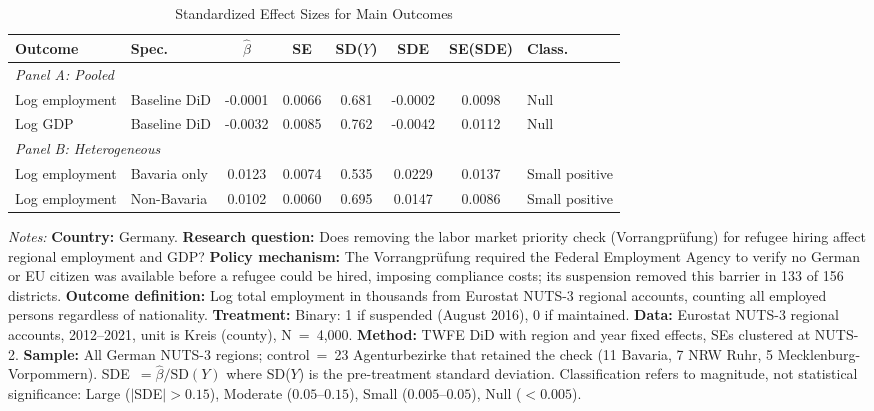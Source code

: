 \begin{table}[H]
\centering
\caption{Standardized Effect Sizes for Main Outcomes}
\label{tab:sde}
\begin{threeparttable}
\scriptsize
\begin{tabular}{llcccccl}
\toprule
Outcome & Spec. & $\hat{\beta}$ & SE & SD($Y$) & SDE & SE(SDE) & Class. \\
\midrule
\multicolumn{8}{l}{\textit{Panel A: Pooled}} \\
Log employment & Baseline DiD & -0.0001 & 0.0066 & 0.681 & -0.0002 & 0.0098 & Null \\
Log GDP & Baseline DiD & -0.0032 & 0.0085 & 0.762 & -0.0042 & 0.0112 & Null \\
\midrule
\multicolumn{8}{l}{\textit{Panel B: Heterogeneous}} \\
Log employment & Bavaria only & 0.0123 & 0.0074 & 0.535 & 0.0229 & 0.0137 & Small positive \\
Log employment & Non-Bavaria & 0.0102 & 0.0060 & 0.695 & 0.0147 & 0.0086 & Small positive \\
\bottomrule
\end{tabular}
\begin{tablenotes}[flushleft]
\footnotesize
\item \textit{Notes:} \textbf{Country:} Germany. \textbf{Research question:} Does removing the labor market priority check (Vorrangpr\"ufung) for refugee hiring affect regional employment and GDP? \textbf{Policy mechanism:} The Vorrangpr\"ufung required the Federal Employment Agency to verify no German or EU citizen was available before a refugee could be hired, imposing compliance costs; its suspension removed this barrier in 133 of 156 districts. \textbf{Outcome definition:} Log total employment in thousands from Eurostat NUTS-3 regional accounts, counting all employed persons regardless of nationality. \textbf{Treatment:} Binary: 1 if suspended (August 2016), 0 if maintained. \textbf{Data:} Eurostat NUTS-3 regional accounts, 2012--2021, unit is Kreis (county), N~=~4,000. \textbf{Method:} TWFE DiD with region and year fixed effects, SEs clustered at NUTS-2. \textbf{Sample:} All German NUTS-3 regions; control~=~23 Agenturbezirke that retained the check (11 Bavaria, 7 NRW Ruhr, 5 Mecklenburg-Vorpommern). SDE~$= \hat{\beta} / \text{SD}(Y)$ where SD($Y$) is the pre-treatment standard deviation. Classification refers to magnitude, not statistical significance: Large ($|$SDE$| > 0.15$), Moderate ($0.05$--$0.15$), Small ($0.005$--$0.05$), Null ($< 0.005$).
\end{tablenotes}
\end{threeparttable}
\end{table}

